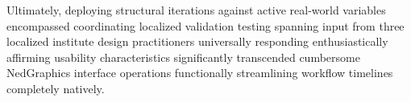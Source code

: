 Ultimately, deploying structural iterations against active real-world variables encompassed coordinating localized validation testing spanning input from three localized institute design practitioners universally responding enthusiastically affirming usability characteristics significantly transcended cumbersome NedGraphics interface operations functionally streamlining workflow timelines completely natively.
